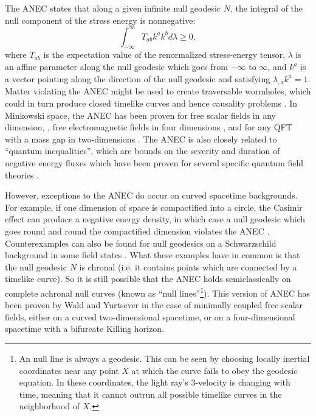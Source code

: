 \documentclass{article}
\begin{document}
The ANEC states that along a given infinite null geodesic $N$, the integral of the null component of the stress energy is nonnegative:
\begin{equation}\label{anec}
\int^{\infty}_{-\infty} T_{ab} k^a k^b d\lambda \ge 0,
\end{equation}
where $T_{ab}$ is the expectation value of the renormalized stress-energy tensor, $\lambda$ is an affine parameter along the null geodesic which goes from $-\infty$ to $\infty$, and $k^a$ is a vector pointing along the direction of the null geodesic and satisfying $\lambda_{,a} k^a = 1$.  Matter violating the ANEC might be used to create traversable wormholes, which could in turn produce closed timelike curves and hence causality problems \cite{MTY88}\cite{FSW93}.  In Minkowski space, the ANEC has been proven for free scalar fields in any dimension, \cite{klink91}, free electromagnetic fields in four dimensions \cite{folacci92}, and for any QFT with a mass gap in two-dimensions \cite{verch00}.  The ANEC is also closely related to ``quantum inequalities'', which are bounds on the severity and duration of negative energy fluxes which have been proven for several specific quantum field theories \cite{FR95}.

However, exceptions to the ANEC do occur on curved spacetime backgrounds.  For example, if one dimension of space is compactified into a circle, the Casimir effect can produce a negative energy density, in which case a null geodesic which goes round and round the compactified dimension violates the ANEC \cite{klink91}.  Counterexamples can also be found for null geodesics on a Schwarzschild background in some field states \cite{visser96}.  What these examples have in common is that the null geodesic $N$ is chronal (i.e. it contains points which are connected by a timelike curve).  So it is still possible that the ANEC holds semiclassically on complete achronal null curves (known as ``null lines''\footnote{An null line is always a geodesic.  This can be seen by choosing locally inertial coordinates near any point $X$ at which the curve fails to obey the geodesic equation.  In these coordinates, the light ray's 3-velocity is changing with time, meaning that it cannot outrun all possible timelike curves in the neighborhood of $X$.}).  This version of ANEC has been proven by Wald and Yurtsever \cite{WY91} in the case of minimally coupled free scalar fields, either on a curved two-dimensional spacetime, or on a four-dimensional spacetime with a bifurcate Killing horizon.
\end{document}
